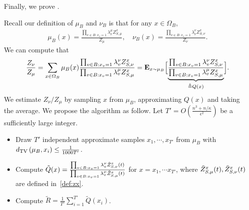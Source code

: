 Finally, we prove . 

Recall our definition of $\mu_B$ and $\nu_B$ is that for any $x \in \Omega_B$,
\begin{align*}
    \mu_B(x)=\frac{\prod_{v\in B:x_v=1}\lambda_v^\mu Z_{S,\mu}^x}{Z_\mu},\quad \nu_B(x)=\frac{\prod_{v\in B:x_v=1}\lambda_v^\nu Z_{S,\nu}^x}{Z_\nu}.
\end{align*}
We can compute that 
\begin{align*}
    \frac{Z_\nu}{Z_\mu}=\sum_{x\in\Omega_B}\mu_B(x)\frac{\prod_{v\in B:x_v=1}\lambda_v^\nu Z_{S,\nu}^x}{\prod_{v\in B:x_v=1}\lambda_v^\mu Z_{S,\mu}^x}=\mathbf{E}_{x \sim \mu_B}\Big[{\underbrace{\frac{\prod_{v\in B:x_v=1}\lambda_v^\nu Z_{S,\nu}^x}{\prod_{v\in B:x_v=1}\lambda_v^\mu Z_{S,\mu}^x}}_{\triangleq Q(x)}}\Big].
\end{align*}
We estimate $Z_\nu/Z_\mu$ by sampling $x$ from $\mu_B$, approximating $Q(x)$ and taking the average. We propose the algorithm as follow. Let $T' = O (\frac{n^3 + n/\kappa}{\epsilon^2})$ be a sufficiently large integer.
\begin{itemize}
    \item Draw $T'$ independent approximate samples $x_1,\cdots,x_{T'}$ from $\mu_B$ with $d_{\mathrm{TV}}\left({\mu_B},{x_i}\right)\leq \frac{1}{1000T'}$. 
    \item Compute $\tilde{Q}(x)=\frac{\prod_{v\in B:x_v=1}\lambda_v^\nu \tilde{Z}_{S,\nu}^x (t)}{\prod_{v\in B:x_v=1}\lambda_v^\mu \tilde{Z}_{S,\mu}^x (t)}$ for $x=x_1,\cdots x_{T'}$, where $\tilde{Z}_{S,\mu}^x (t),\tilde{Z}_{S,\nu}^x (t)$ are defined in~\eqref{def:zx}.
    \item Compute $\tilde{R} = \frac{1}{T'}\sum_{i=1}^{T'}\tilde{Q}(x_i)$.
\end{itemize}

